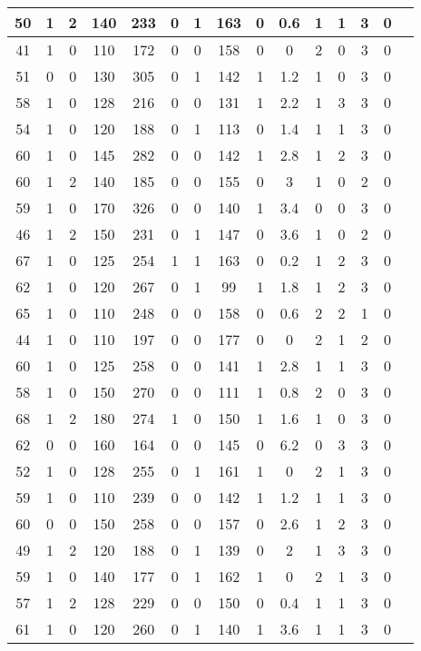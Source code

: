 \documentclass{article}
\begin{document}
\begin{longtable}{
|
c|c|c|c|c|c|c|c|c|c|c|c|c|c|c|}
\hline
50 & 1 & 2 & 140 & 233 & 0 & 1 & 163 & 0 & 0.6 & 1 & 1 & 3 & 0 \\
\hline
41 & 1 & 0 & 110 & 172 & 0 & 0 & 158 & 0 & 0 & 2 & 0 & 3 & 0 \\
\hline
51 & 0 & 0 & 130 & 305 & 0 & 1 & 142 & 1 & 1.2 & 1 & 0 & 3 & 0 \\
\hline
58 & 1 & 0 & 128 & 216 & 0 & 0 & 131 & 1 & 2.2 & 1 & 3 & 3 & 0 \\
\hline
54 & 1 & 0 & 120 & 188 & 0 & 1 & 113 & 0 & 1.4 & 1 & 1 & 3 & 0 \\
\hline
60 & 1 & 0 & 145 & 282 & 0 & 0 & 142 & 1 & 2.8 & 1 & 2 & 3 & 0 \\
\hline
60 & 1 & 2 & 140 & 185 & 0 & 0 & 155 & 0 & 3 & 1 & 0 & 2 & 0 \\
\hline
59 & 1 & 0 & 170 & 326 & 0 & 0 & 140 & 1 & 3.4 & 0 & 0 & 3 & 0 \\
\hline
46 & 1 & 2 & 150 & 231 & 0 & 1 & 147 & 0 & 3.6 & 1 & 0 & 2 & 0 \\
\hline
67 & 1 & 0 & 125 & 254 & 1 & 1 & 163 & 0 & 0.2 & 1 & 2 & 3 & 0 \\
\hline
62 & 1 & 0 & 120 & 267 & 0 & 1 & 99 & 1 & 1.8 & 1 & 2 & 3 & 0 \\
\hline
65 & 1 & 0 & 110 & 248 & 0 & 0 & 158 & 0 & 0.6 & 2 & 2 & 1 & 0 \\
\hline
44 & 1 & 0 & 110 & 197 & 0 & 0 & 177 & 0 & 0 & 2 & 1 & 2 & 0 \\
\hline
60 & 1 & 0 & 125 & 258 & 0 & 0 & 141 & 1 & 2.8 & 1 & 1 & 3 & 0 \\
\hline
58 & 1 & 0 & 150 & 270 & 0 & 0 & 111 & 1 & 0.8 & 2 & 0 & 3 & 0 \\
\hline
68 & 1 & 2 & 180 & 274 & 1 & 0 & 150 & 1 & 1.6 & 1 & 0 & 3 & 0 \\
\hline
62 & 0 & 0 & 160 & 164 & 0 & 0 & 145 & 0 & 6.2 & 0 & 3 & 3 & 0 \\
\hline
52 & 1 & 0 & 128 & 255 & 0 & 1 & 161 & 1 & 0 & 2 & 1 & 3 & 0 \\
\hline
59 & 1 & 0 & 110 & 239 & 0 & 0 & 142 & 1 & 1.2 & 1 & 1 & 3 & 0 \\
\hline
60 & 0 & 0 & 150 & 258 & 0 & 0 & 157 & 0 & 2.6 & 1 & 2 & 3 & 0 \\
\hline
49 & 1 & 2 & 120 & 188 & 0 & 1 & 139 & 0 & 2 & 1 & 3 & 3 & 0 \\
\hline
59 & 1 & 0 & 140 & 177 & 0 & 1 & 162 & 1 & 0 & 2 & 1 & 3 & 0 \\
\hline
57 & 1 & 2 & 128 & 229 & 0 & 0 & 150 & 0 & 0.4 & 1 & 1 & 3 & 0 \\
\hline
61 & 1 & 0 & 120 & 260 & 0 & 1 & 140 & 1 & 3.6 & 1 & 1 & 3 & 0 \\

\end{longtable}
\end{document}
